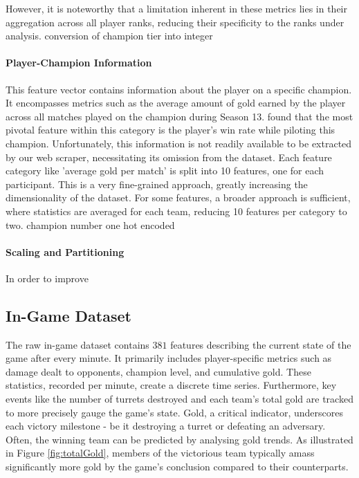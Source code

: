 \documentclass[12pt, a4paper, headinclude, twoside, plainheadsepline, open=right, numbers=noenddot, hidelinks, toc=listof, toc=bibliography]{scrreprt}
\begin{document}
However, it is noteworthy that a limitation inherent in these metrics lies in their aggregation across all player ranks, reducing their specificity to the ranks under analysis.
conversion of champion tier into integer

\paragraph{Player-Champion Information}
This feature vector contains information about the player on a specific champion.
It encompasses metrics such as the average amount of gold earned by the player across all matches played on the champion during Season 13. 
 \cite{costaFeatureAnalysisLeague2021} found that  the most pivotal feature within this category is the player's win rate while piloting this champion.
Unfortunately, this information is not readily available to be extracted by our web scraper,  necessitating its omission from the dataset.
Each feature category like 'average gold per match' is split into 10 features, one for each participant.
This is a very fine-grained approach, greatly increasing the dimensionality of the dataset.
For some features, a broader approach is sufficient, where statistics are averaged for each team, reducing 10 features per category to two.
champion number one hot encoded
\paragraph{Scaling and Partitioning}
In order to improve  


\subsection{In-Game Dataset}
\label{ssec:in_game_data}

The raw in-game dataset contains $381$ features describing the current state of the game after every minute.
It primarily includes player-specific metrics such as damage dealt to opponents, champion level, and cumulative gold. These statistics, recorded per minute, create a discrete time series. Furthermore, key events like the number of turrets destroyed and each team's total gold are tracked to more precisely gauge the game's state. Gold, a critical indicator, underscores each victory milestone - be it destroying a turret or defeating an adversary. Often, the winning team can be predicted by analysing gold trends. As illustrated in Figure \ref{fig:totalGold}, members of the victorious team typically amass significantly more gold by the game's conclusion compared to their counterparts.
\end{document}
